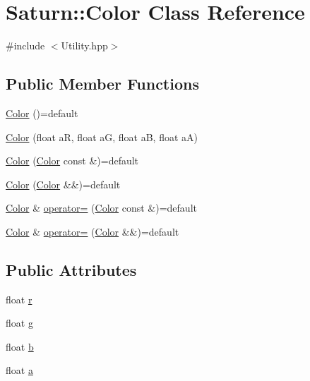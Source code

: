 \hypertarget{class_saturn_1_1_color}{}\section{Saturn\+:\+:Color Class Reference}
\label{class_saturn_1_1_color}


{\ttfamily \#include $<$Utility.\+hpp$>$}

\subsection*{Public Member Functions}
\begin{DoxyCompactItemize}
\item 
\mbox{\hyperlink{class_saturn_1_1_color_a53b6d6aca71d15945bec664a1c1dbe10}{Color}} ()=default
\item 
\mbox{\hyperlink{class_saturn_1_1_color_a1ad1324d4f4fe5af767dc6f269d1aed5}{Color}} (float aR, float aG, float aB, float aA)
\item 
\mbox{\hyperlink{class_saturn_1_1_color_a80aa8e4275404b9c82b6c5063a16bdda}{Color}} (\mbox{\hyperlink{class_saturn_1_1_color}{Color}} const \&)=default
\item 
\mbox{\hyperlink{class_saturn_1_1_color_ab7f1a79d5e3e2699c837aa1d3adfe643}{Color}} (\mbox{\hyperlink{class_saturn_1_1_color}{Color}} \&\&)=default
\item 
\mbox{\hyperlink{class_saturn_1_1_color}{Color}} \& \mbox{\hyperlink{class_saturn_1_1_color_ab5a31b5567d2b3ff91261304028a432d}{operator=}} (\mbox{\hyperlink{class_saturn_1_1_color}{Color}} const \&)=default
\item 
\mbox{\hyperlink{class_saturn_1_1_color}{Color}} \& \mbox{\hyperlink{class_saturn_1_1_color_ad7fa043c0e0d2bcd25530ad309cce1bc}{operator=}} (\mbox{\hyperlink{class_saturn_1_1_color}{Color}} \&\&)=default
\end{DoxyCompactItemize}
\subsection*{Public Attributes}
\begin{DoxyCompactItemize}
\item 
float \mbox{\hyperlink{class_saturn_1_1_color_a0f9197cb78d63428003a39ee6864508a}{r}}
\item 
float \mbox{\hyperlink{class_saturn_1_1_color_ada6898d30a7eef561cf77a35b8a418d7}{g}}
\item 
float \mbox{\hyperlink{class_saturn_1_1_color_af4f29a4f2250895c42b2312a2d862405}{b}}
\item 
float \mbox{\hyperlink{class_saturn_1_1_color_ad6edfed731cab7751d9efd28efbb9c2e}{a}}
\end{DoxyCompactItemize}


